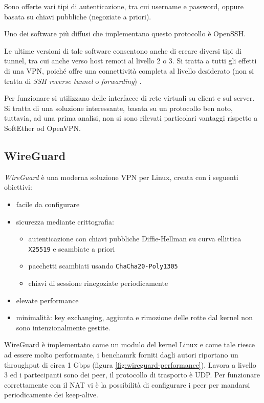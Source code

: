 Sono offerte vari tipi di autenticazione, tra cui username e password, oppure basata
su chiavi pubbliche (negoziate a priori).

Uno dei software più diffusi che implementano questo protocollo è OpenSSH.

Le ultime versioni di tale software consentono anche di creare
diversi tipi di tunnel, tra cui anche verso
host remoti al livello 2 o 3. Si tratta a tutti gli effetti di una VPN, poiché
offre una connettività completa al livello desiderato (non si tratta di
\textit{SSH reverse tunnel} o \textit{forwarding})
\cite{ssh-vpn-ubuntu} \cite{ssh-vpn-debian}.

Per funzionare si utilizzano delle interfacce di rete virtuali
su client e sul server. Si tratta di una soluzione interessante, basata su un
protocollo ben noto, tuttavia, ad una prima analisi, non si sono rilevati
particolari vantaggi rispetto a SoftEther od OpenVPN.

\subsection{WireGuard}
\textit{WireGuard}\cite{DBLP:conf/ndss/Donenfield17} è una moderna soluzione VPN per Linux, creata con i seguenti obiettivi:
\begin{itemize}
	\item facile da configurare
	\item sicurezza mediante crittografia:
	      \begin{itemize}
	      	\item autenticazione con chiavi pubbliche Diffie-Hellman su curva ellittica \texttt{X25519}
	      	      e scambiate a priori \cite{RFC7748}
	      	\item pacchetti scambiati usando \texttt{ChaCha20-Poly1305} \cite{RFC7539}
	      	\item chiavi di sessione rinegoziate periodicamente
	      \end{itemize}
	\item elevate performance
	\item minimalità: key exchanging, aggiunta e rimozione delle rotte dal kernel
	      non sono intenzionalmente gestite.
\end{itemize}
WireGuard è implementato come un modulo del kernel Linux e come tale riesce ad essere
molto performante, i benchamrk forniti dagli autori riportano un throughput di circa
1 Gbps (figura \ref{fig:wireguard-performance}).
Lavora a livello 3 ed i partecipanti sono dei peer,
il protocollo di trasporto è UDP. Per funzionare correttamente con il NAT vi è
la possibilità di configurare i peer per mandarsi periodicamente dei keep-alive.
	      
